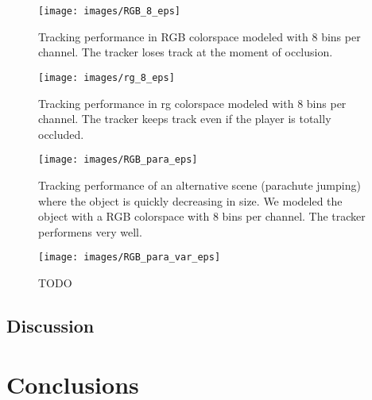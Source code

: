 \documentclass[a4paper,11pt]{article}
\begin{document}
\begin{figure}[!ht]
\label{fig:RGB_8}
\centering
\texttt{[image: images/RGB\_8\_eps]}
\caption{Tracking performance in RGB colorspace modeled with 8 bins per channel.
The tracker loses track at the moment of occlusion.}
\label{fig:rg}
\end{figure}

\begin{figure}[!ht]
\label{fig:rg_8}
\centering
\texttt{[image: images/rg\_8\_eps]}
\caption{Tracking performance in rg colorspace modeled with 8 bins per channel.
The tracker keeps track even if the player is totally occluded.}
\end{figure}

\begin{figure}[!ht]
\label{fig:para}
\centering
\texttt{[image: images/RGB\_para\_eps]}
\caption{Tracking performance of an alternative scene (parachute jumping)
where the object is quickly decreasing in size. We modeled the object with a
RGB colorspace with 8 bins per channel. The tracker performens very well.}
\end{figure}

\begin{figure}[!ht]
\label{fig:para}
\centering
\texttt{[image: images/RGB\_para\_var\_eps]}
\caption{TODO}
\end{figure}
% 
\subsection{Discussion} %
\section{Conclusions} \label{sec:conc}
\end{document}
